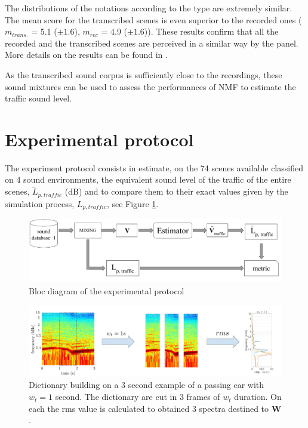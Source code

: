 \documentclass[review,5p,twocolumn,sort&compress,times]{elsarticle}
\begin{document}
The distributions of the notations according to the type are extremely similar. The mean score for the transcribed scenes is even superior to the recorded ones ($m_{trans.}$ = 5.1 ($\pm 1.6$), $m_{rec}$ = 4.9 ($\pm 1.6$)). These results confirm that all the recorded and the transcribed scenes are perceived in a similar way by the panel. More details on the results can be found in  \cite{gloaguen_creation_2017}. 

As the transcribed sound corpus is sufficiently close to the recordings, these sound mixtures can be used to assess the performances of NMF to estimate the traffic sound level.

\section{Experimental protocol}\label{part:expProtocol}

The experiment protocol consists in estimate, on the 74 scenes available classified on 4 sound environments, the equivalent sound level of the traffic of the entire scenes, $\tilde{L}_{p, traffic}$ (dB) and to compare them to their exact values given by the simulation process, $L_{p,traffic}$, see Figure \ref{fig:bloc_diagram_estimator}. 

\begin{figure}[t]
\centering
\includegraphics[width=.9\linewidth]{figures/bloc_diagram_estimator.pdf}
\caption{Bloc diagram of the experimental protocol}
\label{fig:bloc_diagram_estimator}
\end{figure}

\begin{figure}[t]
\centering
\includegraphics[width=0.8\linewidth]{figures/extractionDictionary2.pdf}
\caption{Dictionary building on a 3 second example of a passing car with $w_t = 1$ second. The dictionary are cut in 3 frames of $w_t$ duration. On each the rms value is calculated to obtained 3 spectra destined to $\mathbf{W}$.}
\label{fig:example_dictionary}
\end{figure}
\end{document}
